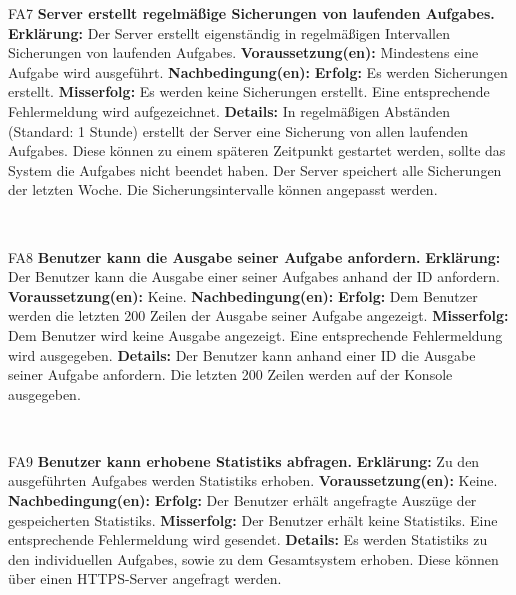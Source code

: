 \documentclass[a4paper,12pt]{article}
\begin{document}
\begin{itemize}[nosep]
	\begin{minipage}[t]{\linewidth}
		\item[FA7] \textbf{\gls{Server} erstellt regelmäßige Sicherungen von laufenden \glspl{Aufgabe}.}
		\subitem \textbf{Erklärung:} Der \gls{Server} erstellt eigenständig in regelmäßigen Intervallen Sicherungen von laufenden \glspl{Aufgabe}.
		\subitem \textbf{Voraussetzung(en):} Mindestens eine \gls{Aufgabe} wird ausgeführt.
		\subitem \textbf{Nachbedingung(en):}
		\subsubitem \textbf{Erfolg:} Es werden Sicherungen erstellt.
		\subsubitem \textbf{Misserfolg:} Es werden keine Sicherungen erstellt. Eine entsprechende Fehlermeldung wird aufgezeichnet.
		\subitem \textbf{Details:} In regelmäßigen Abständen (Standard: 1 Stunde) erstellt der \gls{Server} eine Sicherung von allen laufenden \glspl{Aufgabe}. Diese können zu einem späteren Zeitpunkt gestartet werden, sollte das System die \glspl{Aufgabe} nicht beendet haben. Der \gls{Server} speichert alle Sicherungen der letzten Woche. Die Sicherungsintervalle können angepasst werden.
	\end{minipage}	
	\newline
	\\
	
	\begin{minipage}[t]{\linewidth}
		\item[FA8] \textbf{\gls{Benutzer} kann die Ausgabe seiner \gls{Aufgabe} anfordern.}
		\subitem \textbf{Erklärung:} Der \gls{Benutzer} kann die Ausgabe einer seiner \glspl{Aufgabe} anhand der ID anfordern.
		\subitem \textbf{Voraussetzung(en):} Keine.
		\subitem \textbf{Nachbedingung(en):}
		\subsubitem \textbf{Erfolg:} Dem \gls{Benutzer} werden die letzten 200 Zeilen der Ausgabe seiner \gls{Aufgabe} angezeigt.
		\subsubitem \textbf{Misserfolg:} Dem \gls{Benutzer} wird keine Ausgabe angezeigt. Eine entsprechende Fehlermeldung wird ausgegeben.
		\subitem \textbf{Details:} Der \gls{Benutzer} kann anhand einer ID die Ausgabe seiner \gls{Aufgabe} anfordern. Die letzten 200 Zeilen werden auf der Konsole ausgegeben.
	\end{minipage}	
	\newline
	\\
	
	\begin{minipage}[t]{\linewidth}
	\item[FA9] \textbf{\gls{Benutzer} kann erhobene \glspl{Statistik} abfragen.}
	\subitem \textbf{Erklärung:} Zu den ausgeführten \glspl{Aufgabe} werden \glspl{Statistik} erhoben.
	\subitem \textbf{Voraussetzung(en):} Keine.
	\subitem \textbf{Nachbedingung(en):}
	\subsubitem \textbf{Erfolg:} Der \gls{Benutzer} erhält angefragte Auszüge der gespeicherten \glspl{Statistik}.
	\subsubitem \textbf{Misserfolg:} Der \gls{Benutzer} erhält keine \glspl{Statistik}. Eine entsprechende Fehlermeldung wird gesendet.
	\subitem \textbf{Details:} Es werden \glspl{Statistik} zu den individuellen \glspl{Aufgabe}, sowie zu dem Gesamtsystem erhoben. Diese können über einen HTTPS-\gls{Server} angefragt werden.
\end{minipage}	
\newline
\\	
	
\end{itemize}
\end{document}
